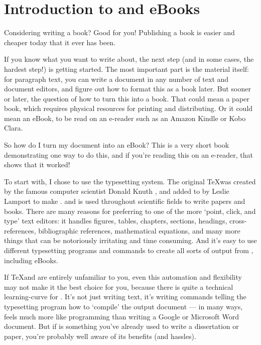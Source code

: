 
\chapter{Introduction to \latex and eBooks}

Considering writing a book? Good for you! Publishing a book is easier and cheaper today 
that it ever has been. 

If you know what you want to write about, the next step (and in some cases, the 
hardest step!) is getting started. The most important part is the material itself: 
for paragraph text, you can write a document in any number of text and document editors, 
and figure out how to format this as a book later. But sooner or later, 
the question of how to turn this into a book. That could mean a paper book, 
which requires physical resources for printing and distributing. Or it could mean
an eBook, to be read on an e-reader such as an Amazon Kindle or Kobo Clara.

So how do I turn my document into an eBook? This is a very short book demonstrating one 
way to do this, and if you're reading this on an e-reader, that shows that it worked!

To start with, I chose to use the \latex typesetting system. 
The original \TeX was created by the famous computer scientist Donald Knuth \cite{knuth1984texbook}, and added to by Leslie Lamport to make \latex \cite{lamport1985i1}.
and is used throughout scientific fields to write papers and books. There are many
reasons for preferring \latex to one of the more `point, click, and type' text editors:
it handles figures, tables, chapters, sections, headings, cross-references, 
bibliographic references, mathematical equations, and many more things that can be 
notoriously irritating and time consuming. And it's easy to use different typesetting
programs and commands to create all sorts of output from \latex, including eBooks.

If \TeX and \latex are entirely unfamiliar to you, even this automation and flexibility 
may not make it the best choice for you, because there is quite a technical 
learning-curve for \latex. It's not just writing text, it's writing commands telling the
typesetting program how to `compile' the output document --- in many ways, \latex
feels much more like programming than writing a Google or Microsoft Word document. But if
\latex is something you've already used to write a dissertation or paper, you're 
probably well aware of its benefits (and hassles). 

